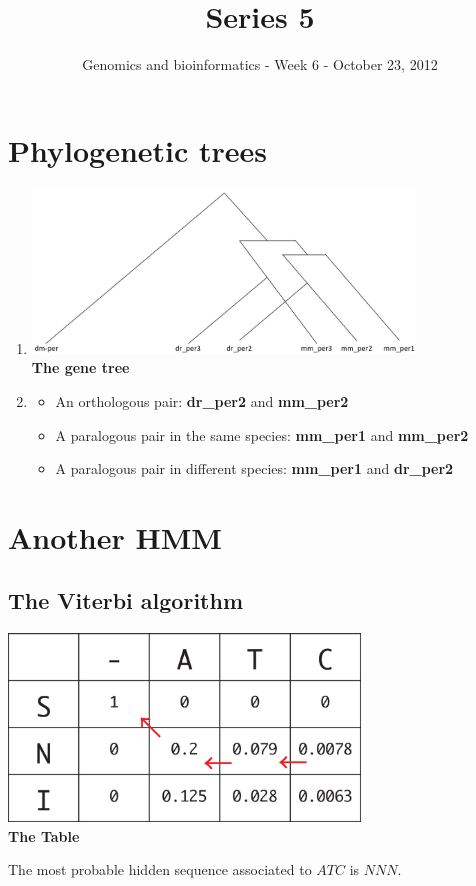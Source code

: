 \documentclass[a4paper,11pt]{article}
\title{Series 5}
\date{}
\author{Genomics and bioinformatics - Week 6 - October 23, 2012}
\begin{document}
\maketitle

\section{Phylogenetic trees}

\begin{enumerate}
\item 
\begin{center}
\includegraphics[width=0.8\textwidth]{tree.png}\\
\vspace{0.5cm}
{\bf The gene tree}
\end{center}

\item
\begin{itemize} 
\item An orthologous pair: {\bf dr\_per2} and {\bf mm\_per2}

\item A paralogous pair in the same species: {\bf mm\_per1} and {\bf mm\_per2}

\item A paralogous pair in different species: {\bf mm\_per1} and {\bf dr\_per2}
\end{itemize}
\end{enumerate}

\section{Another HMM}

\subsection{The Viterbi algorithm} 

\begin{center}
\includegraphics[width=0.7\textwidth]{fig3.eps}\\
\vspace{0.5cm}
{\bf The Table}
\end{center}
The most probable hidden sequence associated to $ATC$ is $NNN$.


\end{document}
